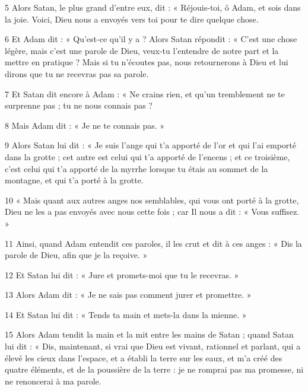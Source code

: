 \par 5 Alors Satan, le plus grand d'entre eux, dit : « Réjouis-toi, ô Adam, et sois dans la joie. Voici, Dieu nous a envoyés vers toi pour te dire quelque chose.

\par 6 Et Adam dit : « Qu'est-ce qu'il y a ? Alors Satan répondit : « C’est une chose légère, mais c’est une parole de Dieu, veux-tu l’entendre de notre part et la mettre en pratique ? Mais si tu n’écoutes pas, nous retournerons à Dieu et lui dirons que tu ne recevras pas sa parole.

\par 7 Et Satan dit encore à Adam : « Ne crains rien, et qu'un tremblement ne te surprenne pas ; tu ne nous connais pas ?

\par 8 Mais Adam dit : « Je ne te connais pas. »

\par 9 Alors Satan lui dit : « Je suis l'ange qui t'a apporté de l'or et qui l'ai emporté dans la grotte ; cet autre est celui qui t'a apporté de l'encens ; et ce troisième, c'est celui qui t'a apporté de la myrrhe lorsque tu étais au sommet de la montagne, et qui t'a porté à la grotte.

\par 10 « Mais quant aux autres anges nos semblables, qui vous ont porté à la grotte, Dieu ne les a pas envoyés avec nous cette fois ; car Il nous a dit : « Vous suffisez. »

\par 11 Ainsi, quand Adam entendit ces paroles, il les crut et dit à ces anges : « Dis la parole de Dieu, afin que je la reçoive. »

\par 12 Et Satan lui dit : « Jure et promets-moi que tu le recevras. »

\par 13 Alors Adam dit : « Je ne sais pas comment jurer et promettre. »

\par 14 Et Satan lui dit : « Tends ta main et mets-la dans la mienne. »

\par 15 Alors Adam tendit la main et la mit entre les mains de Satan ; quand Satan lui dit : « Dis, maintenant, si vrai que Dieu est vivant, rationnel et parlant, qui a élevé les cieux dans l'espace, et a établi la terre sur les eaux, et m'a créé des quatre éléments, et de la poussière de la terre : je ne romprai pas ma promesse, ni ne renoncerai à ma parole.

